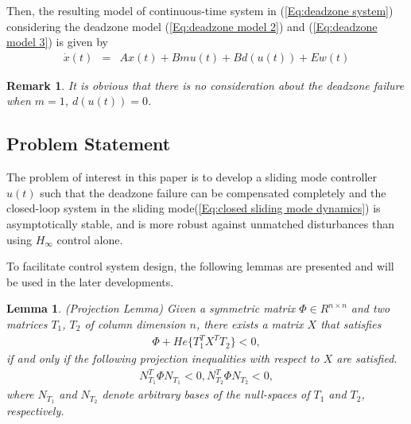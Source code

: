 \documentclass[journal,onecolumn]{IEEEtran}
\newtheorem{Lem}{Lemma}
\newtheorem{rem}{Remark}
\begin{document}
Then, the resulting  model of continuous-time system in
(\ref{Eq:deadzone system}) considering the deadzone model
(\ref{Eq:deadzone model 2}) and (\ref{Eq:deadzone model 3}) is given
by
\begin{equation}
\label{Eq:equivalent system}
\begin{array}{rcl}
   \dot{x}(t) &=& Ax(t)+Bmu(t) + Bd(u(t))+Ew(t)


\end{array}
\end{equation}

\begin{rem}\label{rem4}
 It is obvious that there is no consideration about the deadzone
failure when $m=1$, $d(u(t))=0$.
\end{rem}

\subsection{Problem Statement}
The problem of interest in this paper is to develop
 a sliding mode controller $u(t)$ such that the deadzone failure can be compensated completely and
 the closed-loop system in the sliding mode(\ref{Eq:closed sliding mode dynamics}) is
asymptotically stable, and is more robust against unmatched
disturbances than using $H_\infty$ control alone.




To facilitate control system design, the following lemmas are
presented and will be used in the later developments.
 \begin{Lem} \label{le2} (Projection Lemma)\cite{JiaYM, GahinetP} Given a symmetric matrix
 $\Phi\in R^{n\times n}$ and two matrices $T_1$, $T_2$ of column
 dimension $n$, there exists a matrix $X$ that satisfies
\begin{equation*}
\begin{array}{l}
\Phi+He\{T_1^TX^TT_2\}<0,
\end{array}
\end{equation*}
 if and only if the following projection inequalities with respect
 to $X$ are satisfied.
\begin{equation*}
\begin{array}{l}
N^T_{T_1}\Phi N_{T_1}<0, N^T_{T_2}\Phi N_{T_2}<0,
\end{array}
\end{equation*}
where $N_{T_1}$ and $N_{T_2}$ denote arbitrary bases of the
null-spaces of $T_1$ and $T_2$, respectively.
\end{Lem}
\end{document}
